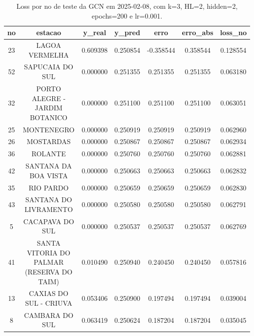 \begin{table}[h]
\centering
\caption{Loss por no de teste da GCN em 2025-02-08, com k=3, HL=2, hidden=2, epochs=200 e lr=0.001.}
\label{tab:gcn_loss_k3_hl2_h2_e200_d20250208}
\begin{tabular}{ccccccc}
\toprule
no & estacao & y\_real & y\_pred & erro & erro\_abs & loss\_no \\
\midrule
23 & LAGOA VERMELHA & 0.609398 & 0.250854 & -0.358544 & 0.358544 & 0.128554 \\
52 & SAPUCAIA DO SUL & 0.000000 & 0.251355 & 0.251355 & 0.251355 & 0.063180 \\
32 & PORTO ALEGRE - JARDIM BOTANICO & 0.000000 & 0.251100 & 0.251100 & 0.251100 & 0.063051 \\
25 & MONTENEGRO & 0.000000 & 0.250919 & 0.250919 & 0.250919 & 0.062960 \\
26 & MOSTARDAS & 0.000000 & 0.250867 & 0.250867 & 0.250867 & 0.062934 \\
36 & ROLANTE & 0.000000 & 0.250760 & 0.250760 & 0.250760 & 0.062881 \\
42 & SANTANA DA BOA VISTA & 0.000000 & 0.250663 & 0.250663 & 0.250663 & 0.062832 \\
35 & RIO PARDO & 0.000000 & 0.250659 & 0.250659 & 0.250659 & 0.062830 \\
43 & SANTANA DO LIVRAMENTO & 0.000000 & 0.250580 & 0.250580 & 0.250580 & 0.062791 \\
5 & CACAPAVA DO SUL & 0.000000 & 0.250537 & 0.250537 & 0.250537 & 0.062769 \\
41 & SANTA VITORIA DO PALMAR (RESERVA DO TAIM) & 0.010490 & 0.250940 & 0.240450 & 0.240450 & 0.057816 \\
13 & CAXIAS DO SUL - CRIUVA & 0.053406 & 0.250900 & 0.197494 & 0.197494 & 0.039004 \\
8 & CAMBARA DO SUL & 0.063419 & 0.250624 & 0.187204 & 0.187204 & 0.035045 \\
\bottomrule
\end{tabular}
\end{table}
